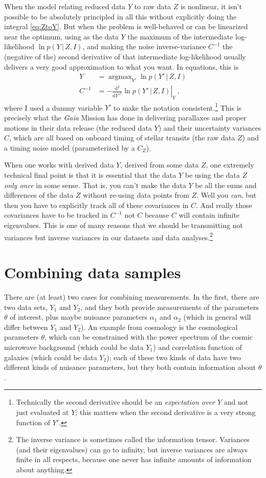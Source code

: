 \documentclass{article}
\newcommand{\dd}{\mathrm{d}}
\newcommand{\given}{\,|\,}
\DeclareMathOperator*{\argmax}{argmax}
\begin{document}
When the model relating reduced data $Y$ to raw data $Z$ is nonlinear, it isn't possible to be absolutely principled in all this without explicitly doing the integral \eqref{eq:ZtoY}.
But when the problem is well-behaved or can be linearized near the optimum, using as the data $Y$ the maximum of the intermediate log-likelihood $\ln p(Y\given Z,I)$, and making the noise inverse-variance $C^{-1}$ the (negative of the) second derivative of that intermediate log-likelihood usually delivers a very good approximation to what you want.
In equations, this is
\begin{align}
    Y &= \argmax_{Y'} \ln p(Y'\given Z, I) \\
    C^{-1} &= - \left.\frac{\dd^2}{\dd {Y'}^2} \ln p(Y'\given Z, I)\right|_Y ~,
\end{align}
where I used a dummy variable $Y'$ to make the notation consistent.\footnote{Technically the second derivative should be an \emph{expectation over $Y$} and not just evaluated at $Y$; this matters when the second derivative is a very strong function of $Y'$.}
This is precisely what the \textsl{Gaia} Mission \cite{gaia} has done in delivering parallaxes and proper motions in their data release \cite{gaiadr3} (the reduced data $Y$) and their uncertainty variances $C$, which are all based on onboard timing of stellar transits (the raw data $Z$) and a timing noise model (parameterized by a $C_Z$).

When one works with derived data $Y$, derived from some data $Z$, one extremely technical final point is that it is essential that the data $Y$ be using the data $Z$ \emph{only once} in some sense.
That is, you can't make the data $Y$ be all the sums and differences of the data $Z$ without re-using data points from $Z$.
Well you \emph{can}, but then you have to explicitly track all of these covariances in $C$.
And really those covariances have to be tracked in $C^{-1}$ not $C$ because $C$ will contain infinite eigenvalues.
This is one of many reasons that we should be transmitting not variances but inverse variances in our datasets and data analyses.\footnote{The inverse variance is sometimes called the information tensor. Variances (and their eigenvalues) can go to infinity, but inverse variances are always finite in all respects, because one never has infinite amounts of information about anything.}

\section{Combining data samples}\label{sec:combining}
There are (at least) two cases for combining measurements.
In the first, there are two data sets, $Y_1$ and $Y_2$, and they both provide measurements of the parameters $\theta$ of interest, plus maybe nuisance parameters $\alpha_1$ and $\alpha_2$ (which in general will differ between $Y_1$ and $Y_2$).
An example from cosmology is the cosmological parameters $\theta$, which can be constrained with the power spectrum of the cosmic microwave background (which could be data $Y_1$) and correlation function of galaxies (which could be data $Y_2$); each of these two kinds of data have two different kinds of nuisance parameters, but they both contain information about $\theta$.
\end{document}
